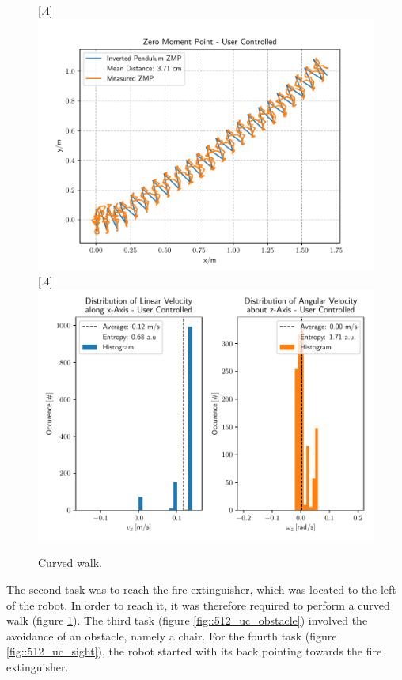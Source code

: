 \begin{figure}[h]
	\centering
	[.4\linewidth]{\includegraphics[scale=.35]{chapters/05_experiments/01_user_controlled_walking/02_test_environment/curved_walk_01_zmp.pdf}}
	[.4\linewidth]{\includegraphics[scale=.35]{chapters/05_experiments/01_user_controlled_walking/02_test_environment/curved_walk_01_entropy.pdf}}
	\caption{Curved walk.}
	\label{fig::512_uc_curved}
\end{figure} 
The second task was to reach the fire extinguisher, which was located to the left of the robot. In order to reach it, it was therefore required to perform a curved walk (figure \ref{fig::512_uc_curved}). The third task (figure \ref{fig::512_uc_obstacle}) involved the avoidance of an obstacle, namely a chair. For the fourth task (figure \ref{fig::512_uc_sight}), the robot started with its back pointing towards the fire extinguisher.
